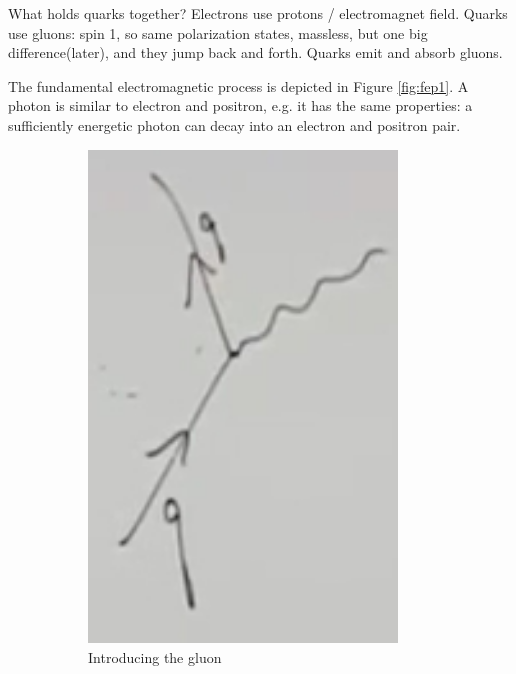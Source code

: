 \documentclass[]{article}
\begin{document}
What holds quarks together? Electrons use protons / electromagnet field. Quarks use gluons: spin 1, so same polarization states, massless, but one big difference(later), and they jump back and forth. Quarks emit and absorb gluons.

The fundamental electromagnetic process is depicted in Figure \ref{fig:fep1}. A photon is similar to electron and positron, e.g. it has the same properties: a sufficiently energetic photon can decay into an electron and positron pair.

\begin{figure}[H]
	\caption{Gluons}
	\begin{subfigure}{0.45\textwidth}
		\caption{Introducing the gluon}
		\includegraphics[width=0.9\textwidth]{2-2-gluon1}
	\end{subfigure}
	\begin{subfigure}{0.45\textwidth}

\end{subfigure}
\end{figure}
\end{document}
